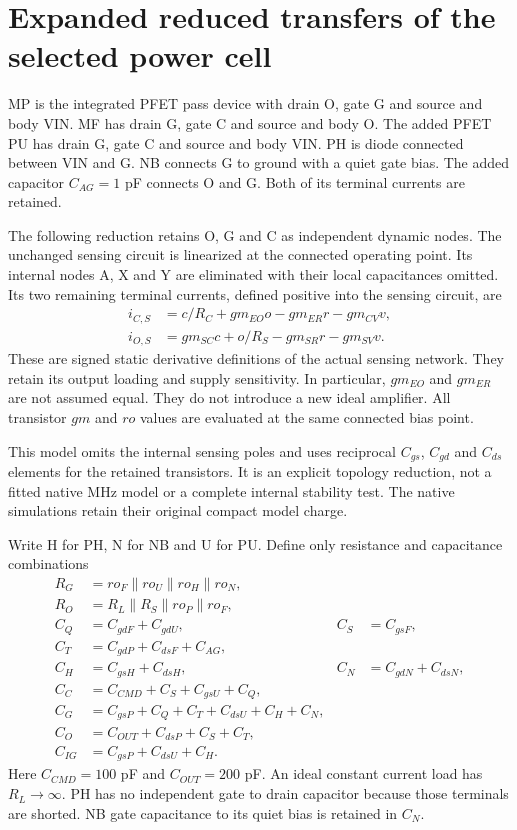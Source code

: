 \documentclass[11pt]{article}
\begin{document}
\section*{Expanded reduced transfers of the selected power cell}
MP is the integrated PFET pass device with drain O, gate G and source and body VIN. MF has drain G, gate C and source and body O. The added PFET PU has drain G, gate C and source and body VIN. PH is diode connected between VIN and G. NB connects G to ground with a quiet gate bias. The added capacitor $C_{AG}=1$ pF connects O and G. Both of its terminal currents are retained.

The following reduction retains O, G and C as independent dynamic nodes. The unchanged sensing circuit is linearized at the connected operating point. Its internal nodes A, X and Y are eliminated with their local capacitances omitted. Its two remaining terminal currents, defined positive into the sensing circuit, are
\begin{align}
i_{C,S}&=c/R_C+gm_{EO}o-gm_{ER}r-gm_{CV}v,\\
i_{O,S}&=gm_{SC}c+o/R_S-gm_{SR}r-gm_{SV}v.
\end{align}
These are signed static derivative definitions of the actual sensing network. They retain its output loading and supply sensitivity. In particular, $gm_{EO}$ and $gm_{ER}$ are not assumed equal. They do not introduce a new ideal amplifier. All transistor $gm$ and $ro$ values are evaluated at the same connected bias point.

This model omits the internal sensing poles and uses reciprocal $C_{gs}$, $C_{gd}$ and $C_{ds}$ elements for the retained transistors. It is an explicit topology reduction, not a fitted native MHz model or a complete internal stability test. The native simulations retain their original compact model charge.

Write H for PH, N for NB and U for PU. Define only resistance and capacitance combinations
\begin{align}
R_G&=ro_F\parallel ro_U\parallel ro_H\parallel ro_N,\\
R_O&=R_L\parallel R_S\parallel ro_P\parallel ro_F,\\
C_Q&=C_{gdF}+C_{gdU},& C_S&=C_{gsF},\\
C_T&=C_{gdP}+C_{dsF}+C_{AG},\\
C_H&=C_{gsH}+C_{dsH},& C_N&=C_{gdN}+C_{dsN},\\
C_C&=C_{CMD}+C_S+C_{gsU}+C_Q,\\
C_G&=C_{gsP}+C_Q+C_T+C_{dsU}+C_H+C_N,\\
C_O&=C_{OUT}+C_{dsP}+C_S+C_T,\\
C_{IG}&=C_{gsP}+C_{dsU}+C_H.
\end{align}
Here $C_{CMD}=100$ pF and $C_{OUT}=200$ pF. An ideal constant current load has $R_L\to\infty$. PH has no independent gate to drain capacitor because those terminals are shorted. NB gate capacitance to its quiet bias is retained in $C_N$.
\end{document}
